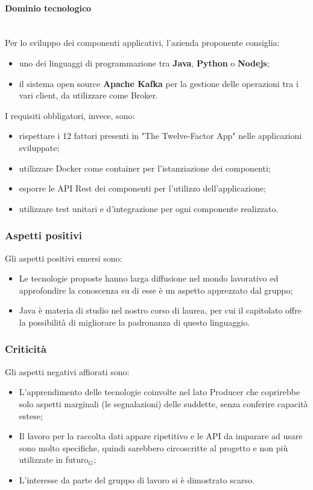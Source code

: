 \paragraph{Dominio tecnologico}\mbox{}\\
Per lo sviluppo dei componenti applicativi, l'azienda proponente consiglia:
\begin{itemize}
	\item uno dei linguaggi di programmazione tra \textbf{Java},
	\textbf{Python} o \textbf{Nodejs};
	\item il sistema open source \textbf{Apache Kafka} per la gestione delle
	operazioni tra i vari client, da utilizzare come Broker.
\end{itemize}
I requisiti obbligatori, invece, sono:
\begin{itemize}
	\item rispettare i 12 fattori presenti in "The Twelve-Factor App" nelle 
	applicazioni sviluppate;
	\item utilizzare Docker come container per l'istanziazione dei componenti;
	\item esporre le API Rest dei componenti per l'utilizzo dell'applicazione; 
	\item utilizzare test unitari e d'integrazione per ogni componente 
	realizzato.
\end{itemize}
\subsubsection{Aspetti positivi}
Gli aspetti positivi emersi sono:
\begin{itemize}
	\item Le tecnologie proposte hanno larga diffusione nel mondo lavorativo ed
	 approfondire la conoscenza su di esse è un aspetto apprezzato dal gruppo;
	\item Java è materia di studio nel nostro corso di laurea, per cui il
	 capitolato offre la possibilità di migliorare la padronanza di questo
	 linguaggio.
\end{itemize}
\subsubsection{Criticità}
Gli aspetti negativi affiorati sono: 
\begin{itemize}
	\item L'apprendimento delle tecnologie coinvolte nel lato Producer che
	 coprirebbe solo aspetti marginali (le segnalazioni) delle suddette, 
	 senza conferire capacità estese;
	\item Il lavoro per la raccolta dati appare ripetitivo e le
	 API da imparare ad usare sono molto specifiche, quindi sarebbero 
	 circoscritte al progetto e non più utilizzate in futuro$_{G}$;
	\item L'interesse da parte del gruppo di lavoro si è dimostrato scarso.
	
\end{itemize}
